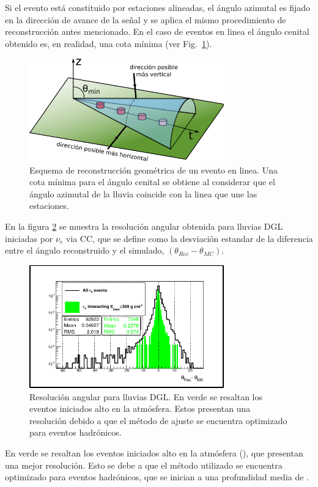 	Si el evento está constituido por estaciones alineadas, el ángulo azimutal es fijado en la dirección de avance de la señal y se aplica el mismo procedimiento de reconstrucción antes mencionado.
	En el caso de eventos en linea el ángulo cenital obtenido es, en realidad, una cota mínima (ver Fig.~\ref{fig:conoLineEvent}).
	\begin{figure}[ht]
	\begin{center}
	\includegraphics[width=0.75\textwidth]{fig/seleccionAuger/conoLineEvent.pdf}
	\caption{Esquema de reconstrucción geométrica de un evento en linea. Una cota mínima para el ángulo cenital se obtiene al considerar que el ángulo azimutal de la lluvia coincide con la linea que une las estaciones.}
	\label{fig:conoLineEvent}
	\end{center}
	\end{figure} 
	
	En la figura \ref{fig:resDGL} se muestra la resolución angular obtenida para lluvias DGL iniciadas por $\nu_e$ via CC, que se define como la desviación estandar de la diferencia entre el ángulo reconstruido y el simulado, $(\theta_{Rec}-\theta_{MC})$.
	\begin{figure}[ht]
	\begin{center}
	\includegraphics[width=0.75\textwidth]{fig/seleccionAuger/resDGL.pdf}
	\caption{Resolución angular para lluvias DGL. En verde se resaltan los eventos iniciados alto en la atmósfera. Estos presentan una resolución debido a que el método de ajuste se encuentra optimizado para eventos hadrónicos.}
	\label{fig:resDGL}
	\end{center}
	\end{figure}
	En verde se resaltan los eventos iniciados alto en la atmósfera (), que presentan una mejor resolución. 
	Esto se debe a que el método utilizado se encuentra optimizado para eventos hadrónicos, que se inician a una profundidad media de .
	
